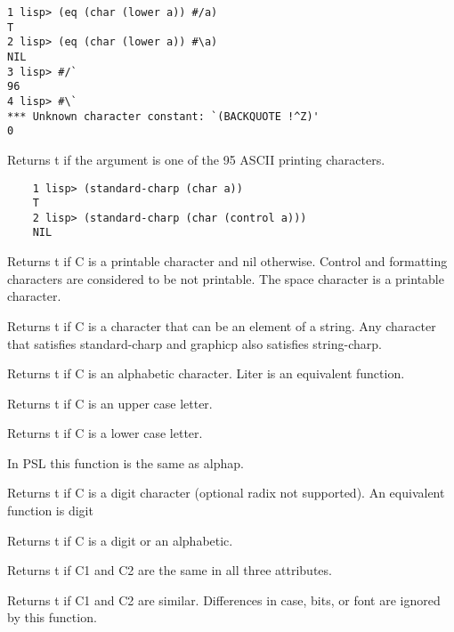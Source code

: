 \begin{verbatim}
1 lisp> (eq (char (lower a)) #/a)
T
2 lisp> (eq (char (lower a)) #\a)
NIL
3 lisp> #/`
96
4 lisp> #\`
*** Unknown character constant: `(BACKQUOTE !^Z)'
0
\end{verbatim}

{    Returns t if the argument is one of the  95  ASCII  printing
    characters.
}
\begin{verbatim}
    1 lisp> (standard-charp (char a))
    T
    2 lisp> (standard-charp (char (control a)))
    NIL
\end{verbatim}

{    Returns  t  if C is a printable character and nil otherwise.
    Control and formatting characters are considered to  be  not
    printable.  The space character is a printable character.
}

{    Returns  t  if  C is a character that can be an element of a
    string.  Any character  that  satisfies  standard-charp  and
    graphicp also satisfies string-charp.
}

{    Returns  t  if  C  is  an alphabetic character.  Liter is an
    equivalent function.
}

{    Returns t if C is an upper case letter.
}

{    Returns t if C is a lower case letter.
}

{    In PSL this function is the same as alphap.
}

{    Returns t if C is a  digit  character  (optional  radix  not
    supported).  An equivalent function is digit
}

{    Returns t if C is a digit or an alphabetic.
}

{    Returns t if C1 and C2 are the same in all three attributes.
}

{    Returns  t  if  C1 and C2 are similar.  Differences in case,
    bits, or font are ignored by this function.
}


